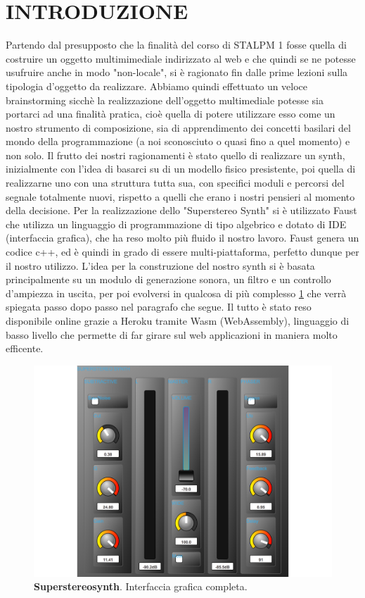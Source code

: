 \documentclass[
	a4paper,
	twocolumn
	]{article}
\begin{document}
\maketitle
\thispagestyle{empty}
\section*{INTRODUZIONE}
Partendo dal presupposto che la finalità del corso di STALPM 1 fosse quella
di costruire un oggetto multimimediale indirizzato al web e che quindi se ne
potesse usufruire anche in modo "non-locale", si è ragionato fin dalle prime
lezioni sulla tipologia d'oggetto da realizzare. Abbiamo quindi effettuato
un veloce brainstorming sicchè la realizzazione dell'oggetto multimediale
potesse sia portarci ad una finalità pratica, cioè quella di potere utilizzare
esso come un nostro strumento di composizione, sia di apprendimento dei concetti
basilari del mondo della programmazione (a noi sconosciuto o quasi fino a quel
momento) e non solo. Il frutto dei nostri ragionamenti è stato quello di realizzare un synth,
inizialmente con l'idea di basarci su di un modello fisico presistente, poi quella di
realizzarne uno con una struttura tutta sua, con specifici moduli e percorsi del segnale
totalmente nuovi, rispetto a quelli che erano i nostri pensieri al momento della decisione.
Per la realizzazione dello "Superstereo Synth" si è utilizzato Faust \cite{faust}
che utilizza un linguaggio di programmazione di tipo algebrico e dotato di IDE (interfaccia grafica), che
ha reso molto più fluido il nostro lavoro. Faust genera un codice c++, ed è quindi in grado
di essere multi-piattaforma, perfetto dunque per il nostro utilizzo. L'idea per
la construzione del nostro synth si è basata principalmente su un modulo di generazione sonora, un filtro e
un controllo d'ampiezza in uscita, per poi evolversi in qualcosa di più complesso \ref{superstereosynth} che verrà spiegata passo dopo passo nel paragrafo che segue. Il tutto è stato reso disponibile online \cite{heroku} grazie
a Heroku tramite Wasm (WebAssembly), linguaggio di basso livello che permette di far girare sul web applicazioni in maniera molto efficente.

\begin{figure}[h]
\begin{center}
\includegraphics[width=.47\textwidth]{img/Superstereosynth}
\caption{\textbf{Superstereosynth}. Interfaccia grafica completa.}
\label{superstereosynth}
\end{center}
\end{figure}
\end{document}
